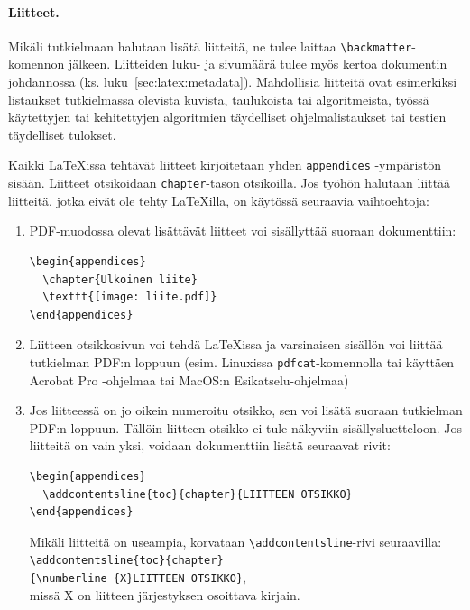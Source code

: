 \paragraph{Liitteet.}
Mikäli tutkielmaan halutaan lisätä liitteitä, ne tulee laittaa \verb+\backmatter+-komennon jälkeen. Liitteiden luku- ja sivumäärä tulee myös kertoa dokumentin johdannossa (ks. luku~\ref{sec:latex:metadata}). Mahdollisia liitteitä ovat esimerkiksi listaukset tutkielmassa olevista kuvista, taulukoista tai algoritmeista, työssä käytettyjen tai kehitettyjen algoritmien täydelliset ohjelmalistaukset tai testien täydelliset tulokset. 

Kaikki \LaTeX{issa} tehtävät liitteet kirjoitetaan yhden \texttt{appendices}
-ympäristön sisään. Liitteet otsikoidaan \texttt{chapter}-tason otsikoilla. Jos työhön halutaan liittää liitteitä, jotka eivät ole tehty \LaTeX{illa}, on käytössä seuraavia vaihtoehtoja:
\begin{enumerate}
\item PDF-muodossa olevat lisättävät liitteet voi sisällyttää suoraan dokumenttiin:
\begin{verbatim}
\begin{appendices}
  \chapter{Ulkoinen liite}
  \texttt{[image: liite.pdf]}
\end{appendices}
\end{verbatim}
\item Liitteen otsikkosivun voi tehdä \LaTeX{issa} ja varsinaisen sisällön voi liittää tutkielman PDF:n loppuun (esim. Linuxissa \texttt{pdfcat}-komennolla tai käyttäen Acrobat Pro -ohjelmaa tai MacOS:n Esikatselu-ohjelmaa)
\item Jos liitteessä on jo oikein numeroitu otsikko, sen voi lisätä suoraan tutkielman PDF:n loppuun. Tällöin liitteen otsikko ei tule näkyviin sisällysluetteloon. Jos liitteitä on vain yksi, voidaan dokumenttiin lisätä seuraavat rivit:
\begin{verbatim}
\begin{appendices}
  \addcontentsline{toc}{chapter}{LIITTEEN OTSIKKO}
\end{appendices}
\end{verbatim}
  Mikäli liitteitä on useampia, korvataan \verb+\addcontentsline+-rivi seuraavilla:\\
  \verb+\addcontentsline{toc}{chapter}+\\
  \verb+{\numberline {X}LIITTEEN OTSIKKO}+,\\
  missä X on liitteen järjestyksen osoittava kirjain.
\end{enumerate}

